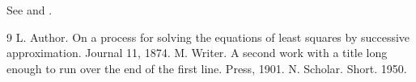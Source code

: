 \documentclass{article}
\begin{document}
See \cite{a} and \cite{b,c}.
\begin{thebibliography}{9}
 L. Author. On a process for solving the equations of least squares by successive approximation. Journal 11, 1874.
 M. Writer. A second work with a title long enough to run over the end of the first line. Press, 1901.
 N. Scholar. Short. 1950.
\end{thebibliography}
\end{document}
